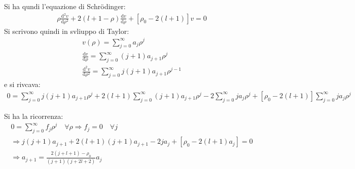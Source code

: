 Si ha qundi l'equazione di Schrödinger:
\begin{equation}\begin{split}
\rho\frac{\textrm{d}^2v}{\textrm{d}\rho^2}+2\left(l+1-\rho\right)\frac{\textrm{d}v}{\textrm{d}\rho}+\left[\rho_0-2\left(l+1\right)\right]v=0
\end{split}\end{equation}
Si scrivono quindi in svliuppo di Taylor:
\begin{equation}\begin{split}
v\left(\rho\right)=\sum_{j=0}^{\infty }{a_j\rho^j} \\
\frac{\textrm{d}v}{\textrm{d}\rho}=\sum_{j=0}^{\infty }{\left(j+1\right)a_{j+1}\rho^j} \\
\frac{\textrm{d}^2v}{\textrm{d}\rho^2}=\sum_{j=0}^{\infty }{j\left(j+1\right)a_{j+1}\rho^{j-1}}
\end{split}\end{equation}
e si rivcava:
\begin{equation}\begin{split}
0=\sum_{j=0}^{\infty }{j\left(j+1\right)a_{j+1}\rho^{j}}+2\left(l+1\right)\sum_{j=0}^{\infty }{\left(j+1\right)a_{j+1}\rho^j}-2\sum_{j=0}^{\infty }{ja_j\rho^j}+\left[\rho_0-2\left(l+1\right)\right]\sum_{j=0}^{\infty }{ja_j\rho^j}
\end{split}\end{equation}

Si ha la ricorrenza:
\begin{equation}\begin{split}
0=\sum_{j=0}^{\infty }{f_j\rho^j} \quad \forall \rho \Longrightarrow f_j=0 \quad \forall j \\
\Longrightarrow j\left(j+1\right)a_{j+1}+2\left(l+1\right)\left(j+1\right)a_{j+1}-2ja_j+\left[\rho_0-2\left(l+1\right)a_j\right]=0 \\
\Longrightarrow a_{j+1}=\frac{2\left(j+l+1\right)-\rho_0}{\left(j+1\right)\left(j+2l+2\right)}a_j
\end{split}\end{equation}


